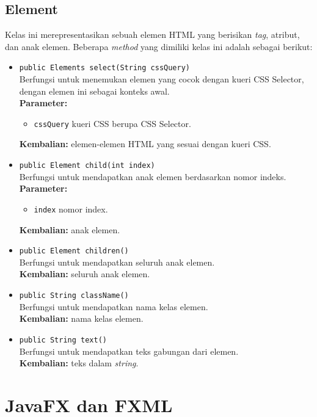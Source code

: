 \subsection{Element}
Kelas ini merepresentasikan sebuah elemen HTML yang berisikan \textit{tag}, atribut, dan anak elemen. Beberapa \textit{method} yang dimiliki kelas ini adalah sebagai berikut:
\begin{itemize}
    	\item \texttt{public Elements select(String cssQuery)} \\
		Berfungsi untuk menemukan elemen yang cocok dengan kueri CSS Selector, dengan elemen ini sebagai konteks awal. \\
		\textbf{Parameter:} 
		\begin{itemize}
			\item \texttt{cssQuery} kueri CSS berupa CSS Selector.
		\end{itemize}
		\textbf{Kembalian:} elemen-elemen HTML yang sesuai dengan kueri CSS.	

    	\item \texttt{public Element child(int index)} \\
		Berfungsi untuk mendapatkan anak elemen berdasarkan nomor indeks. \\
		\textbf{Parameter:} 
		\begin{itemize}
			\item \texttt{index} nomor index.
		\end{itemize}
		\textbf{Kembalian:} anak elemen.	
		
		\item \texttt{public Element children()} \\
		Berfungsi untuk mendapatkan seluruh anak elemen. \\
		\textbf{Kembalian:} seluruh anak elemen.	
		
		\item \texttt{public String className()} \\
		Berfungsi untuk mendapatkan nama kelas elemen. \\
		\textbf{Kembalian:} nama kelas elemen.	
		
		\item \texttt{public String text()} \\
		Berfungsi untuk mendapatkan teks gabungan dari elemen. \\
		\textbf{Kembalian:} teks dalam \textit{string}.	
\end{itemize}

\section{JavaFX dan FXML}

